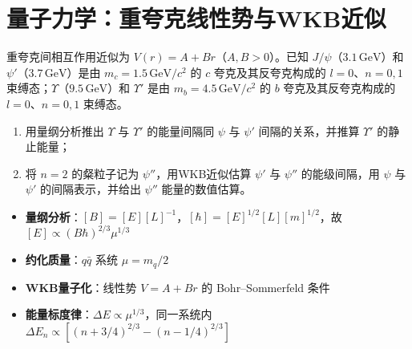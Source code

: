 \section{量子力学：重夸克线性势与WKB近似}
\label{sec:quark-linear-potential}

\begin{modelbox}[题目：重夸克线性势与WKB近似]
重夸克间相互作用近似为 $V(r)=A+Br$（$A,B>0$）。已知 $J/\psi$（$3.1\,\text{GeV}$）和 $\psi'$（$3.7\,\text{GeV}$）是由 $m_c=1.5\,\text{GeV}/c^2$ 的 $c$ 夸克及其反夸克构成的 $l=0$、$n=0,1$ 束缚态；$\Upsilon$（$9.5\,\text{GeV}$）和 $\Upsilon'$ 是由 $m_b=4.5\,\text{GeV}/c^2$ 的 $b$ 夸克及其反夸克构成的 $l=0$、$n=0,1$ 束缚态。
\begin{enumerate}
    \item 用量纲分析推出 $\Upsilon$ 与 $\Upsilon'$ 的能量间隔同 $\psi$ 与 $\psi'$ 间隔的关系，并推算 $\Upsilon'$ 的静止能量；
    \item 将 $n=2$ 的粲粒子记为 $\psi''$，用WKB近似估算 $\psi'$ 与 $\psi''$ 的能级间隔，用 $\psi$ 与 $\psi'$ 的间隔表示，并给出 $\psi''$ 能量的数值估算。
\end{enumerate}
\end{modelbox}

\begin{tipbox}[考点快速分析]
\begin{itemize}
    \item \textbf{量纲分析}：$[B]=[E][L]^{-1}$，$[\hbar]=[E]^{1/2}[L][m]^{1/2}$，故 $[E]\propto(B\hbar)^{2/3}\mu^{1/3}$
    \item \textbf{约化质量}：$q\bar q$ 系统 $\mu=m_q/2$
    \item \textbf{WKB量子化}：线性势 $V=A+Br$ 的 Bohr--Sommerfeld 条件
    \item \textbf{能量标度律}：$\Delta E\propto\mu^{1/3}$，同一系统内 $\Delta E_{n}\propto[(n+3/4)^{2/3}-(n-1/4)^{2/3}]$
\end{itemize}
\end{tipbox}

